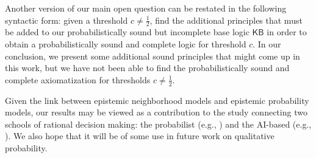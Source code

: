 \documentclass[12pt]{article}
\theoremstyle{definition}
\newcommand{\Rat}{\mathbb{Q}}  %
\newcommand{\KB}{{\mathsf{KB}}}                 %
\begin{document}
Another version of our main open question can be restated in the
following syntactic form: given a threshold $c\neq\frac 12$, find the
additional principles that must be added to our probabilistically
sound but incomplete base logic $\KB$ in order to obtain a
probabilistically sound and complete logic for threshold $c$.  In our
conclusion, we present some additional sound principles that might
come up in this work, but we have not been able to find the
probabilistically sound and complete axiomatization for thresholds
$c\neq\frac 12$.

Given the link between epistemic neighborhood models and epistemic
probability models, our results may be viewed as a contribution to the
study connecting two schools of rational decision making: the
probabilist (e.g., \cite{koerner2008naive}) and the AI-based (e.g.,
\cite{KyburgTeng2012:tlorkr}).  We also hope that it will be of some
use in future work on qualitative probability.



\end{document}
